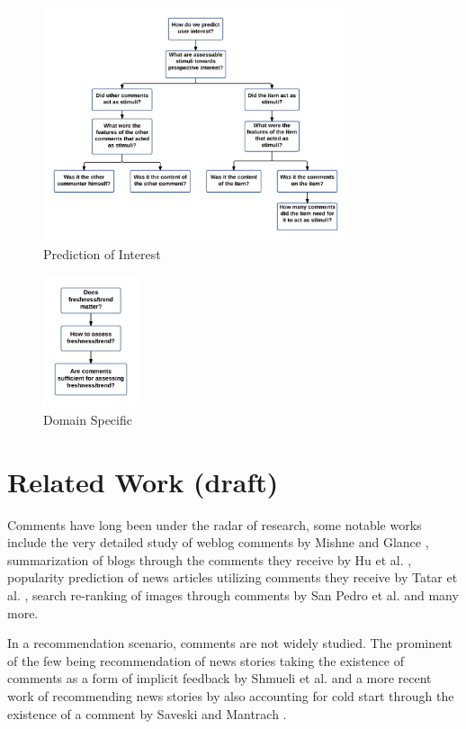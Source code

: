 \begin{figure}[!h]
\centering
\includegraphics[width=0.8\textwidth]{c-intro_images/r_questions_2.png}
\caption{Prediction of Interest}
\label{fig:r_questions_pred}
\end{figure}

\begin{figure}[!h]
\centering
\includegraphics[width=0.25\textwidth]{c-intro_images/r_questions_3.png}
\caption{Domain Specific}
\label{fig:r_questions_misc}
\end{figure}

\section{Related Work (draft)}
Comments have long been under the radar of research, some notable works include the very detailed study of weblog comments by Mishne and Glance \cite{mishne_leave_2006}, summarization of blogs through the comments they receive by Hu et al. \cite{hu_comments-oriented_2008}, popularity prediction of news articles utilizing comments they receive by Tatar et al. \cite{tatar_predicting_2011}, search re-ranking of images through comments by San Pedro et al. \cite{san_pedro_leveraging_2012} and many more. 

In a recommendation scenario, comments are not widely studied. The prominent of the few being recommendation of news stories taking the existence of comments as a form of implicit feedback by Shmueli et al. \cite{shmueli_care_2012} and a more recent work of recommending news stories by also accounting for cold start through the existence of a comment by Saveski and Mantrach \cite{saveski_item_2014}.

